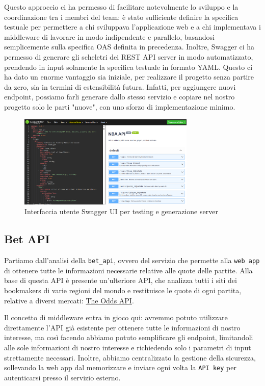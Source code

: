 Questo approccio ci ha permesso di facilitare notevolmente lo sviluppo e la coordinazione tra i membri del team: è stato sufficiente definire la specifica testuale per permettere a chi sviluppava l'applicazione web e a chi implementava i middleware di lavorare in modo indipendente e parallelo, basandosi semplicemente sulla specifica OAS definita in precedenza. Inoltre, Swagger ci ha permesso di generare gli scheletri dei REST API server in modo automatizzato, prendendo in input solamente la specifica testuale in formato YAML. Questo ci ha dato un enorme vantaggio sia iniziale, per realizzare il progetto senza partire da zero, sia in termini di estensibilità futura. Infatti, per aggiungere nuovi endpoint, possiamo farli generare dallo stesso servizio e copiare nel nostro progetto solo le parti "nuove", con uno sforzo di implementazione minimo.

\begin{figure}[H]
    \centering
    \includegraphics[width=0.75\textwidth]{img/swagger_ui.png}
    \caption{Interfaccia utente Swagger UI per testing e generazione server}
\end{figure}

\subsection{Bet API}

Partiamo dall'analisi della \texttt{bet\_api}, ovvero del servizio che permette alla \texttt{web app} di ottenere tutte le informazioni necessarie relative alle quote delle partite. Alla base di questa API è presente un'ulteriore API, che analizza tutti i siti dei bookmakers di varie regioni del mondo e restituisce le quote di ogni partita, relative a diversi mercati: \href{https://the-odds-api.com/}{The Odds API}.

Il concetto di middleware entra in gioco qui: avremmo potuto utilizzare direttamente l'API già esistente per ottenere tutte le informazioni di nostro interesse, ma così facendo abbiamo potuto semplificare gli endpoint, limitandoli alle sole informazioni di nostro interesse e richiedendo solo i parametri di input strettamente necessari. Inoltre, abbiamo centralizzato la gestione della sicurezza, sollevando la web app dal memorizzare e inviare ogni volta la \texttt{API key} per autenticarsi presso il servizio esterno.

